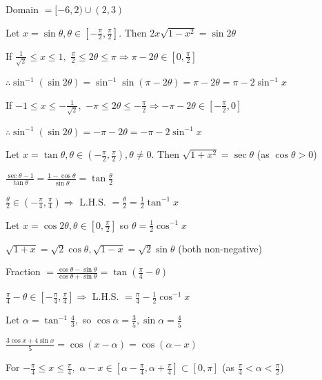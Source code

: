   Domain $= [-6, 2)\cup(2, 3)$

\item Let $x = \sin\theta, \theta\in\left[-\frac{\pi}{2}, \frac{\pi}{2}\right].$ Then $2x\sqrt{1 - x^2} = \sin2\theta$

  If $\frac{1}{\sqrt{2}}\leq x\leq 1,$ $\frac{\pi}{2}\leq 2\theta\leq \pi \Rightarrow \pi - 2\theta\in\left[0,
  \frac{\pi}{2}\right]$

  $\therefore \sin^{-1}(\sin2\theta) = \sin^{-1}\sin(\pi - 2\theta) = \pi - 2\theta = \pi - 2\sin^{-1}x$

  If $-1\leq x\leq -\frac{1}{\sqrt{2}},$ $-\pi\leq 2\theta\leq -\frac{\pi}{2} \Rightarrow -\pi - 2\theta\in\left[-\frac{\pi}{2},
  0\right]$

  $\therefore \sin^{-1}(\sin2\theta) = -\pi - 2\theta = -\pi - 2\sin^{-1}x$

\item Let $x = \tan\theta, \theta\in\left(-\frac{\pi}{2}, \frac{\pi}{2}\right), \theta\neq 0.$ Then $\sqrt{1 + x^2} =
  \sec\theta$ (as $\cos\theta > 0$)

  $\frac{\sec\theta - 1}{\tan\theta} = \frac{1 - \cos\theta}{\sin\theta} = \tan\frac{\theta}{2}$

  $\frac{\theta}{2}\in\left(-\frac{\pi}{4}, \frac{\pi}{4}\right) \Rightarrow$ L.H.S. $= \frac{\theta}{2} = \frac{1}{2}\tan^{-1}x$

\item Let $x = \cos2\theta, \theta\in\left[0, \frac{\pi}{2}\right]$ so $\theta = \frac{1}{2}\cos^{-1}x$

  $\sqrt{1 + x} = \sqrt{2}\cos\theta, \sqrt{1 - x} = \sqrt{2}\sin\theta$ (both non-negative)

  Fraction $= \frac{\cos\theta - \sin\theta}{\cos\theta + \sin\theta} = \tan\left(\frac{\pi}{4} - \theta\right)$

  $\frac{\pi}{4} - \theta\in\left[-\frac{\pi}{4}, \frac{\pi}{4}\right] \Rightarrow$ L.H.S. $= \frac{\pi}{4} - \frac{1}{2}\cos^{-1}x$

\item Let $\alpha = \tan^{-1}\frac{4}{3},$ so $\cos\alpha = \frac{3}{5}, \sin\alpha = \frac{4}{5}$

  $\frac{3\cos x + 4\sin x}{5} = \cos(x - \alpha) = \cos(\alpha - x)$

  For $-\frac{\pi}{4}\leq x\leq \frac{\pi}{4},$ $\alpha - x\in\left[\alpha - \frac{\pi}{4}, \alpha + \frac{\pi}{4}\right]\subset[0,
  \pi]$ (as $\frac{\pi}{4} < \alpha < \frac{\pi}{2}$)

